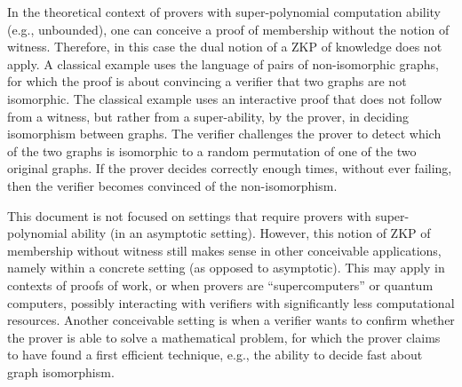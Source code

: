 	In the theoretical context of provers with super-polynomial computation ability (e.g., unbounded), one can conceive a proof of membership without the notion of witness.
Therefore, in this case the dual notion of a ZKP of knowledge does not apply.
	A classical example uses the language of pairs of non-isomorphic graphs,  %
for which the proof is about convincing a verifier that two graphs are not isomorphic.
	The classical example uses an interactive proof that does not follow from a witness, but rather from a super-ability, by the prover, in deciding isomorphism between graphs.
	The verifier challenges the prover to detect which of the two graphs is isomorphic to a random permutation of one of the two original graphs.
    If the prover decides correctly enough times, without ever failing, then the verifier becomes convinced of the non-isomorphism.

	This document is not focused on settings that require provers with super-polynomial ability (in an asymptotic setting).
	However, this notion of ZKP of membership without witness still makes sense in other conceivable applications, namely within a concrete setting (as opposed to asymptotic).
	This may apply in contexts of proofs of work, or when provers are ``supercomputers''  or quantum computers, possibly interacting with verifiers with significantly less computational resources.
    Another conceivable setting is when a verifier wants to confirm whether the prover is able to solve a mathematical problem, for which the prover claims to have found a first efficient technique, e.g., the ability to decide fast about graph isomorphism.
 \loosen




